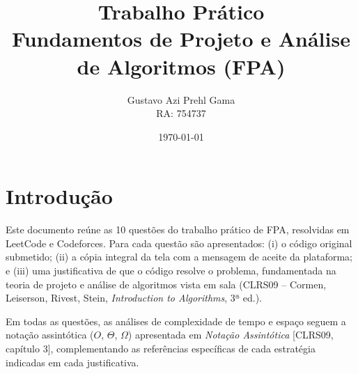 \documentclass[12pt,a4paper]{article}
\title{Trabalho Prático\\\large Fundamentos de Projeto e Análise de Algoritmos (FPA)}
\author{Gustavo Azi Prehl Gama \\ RA: 754737}
\date{\today}
\begin{document}
\maketitle

\section*{Introdução}

Este documento reúne as 10 questões do trabalho prático de FPA, resolvidas
em LeetCode e Codeforces. Para cada questão são apresentados: (i) o código
original submetido; (ii) a cópia integral da tela com a mensagem de aceite
da plataforma; e (iii) uma justificativa de que o código resolve o problema,
fundamentada na teoria de projeto e análise de algoritmos vista em sala
(CLRS09 -- Cormen, Leiserson, Rivest, Stein, \emph{Introduction to
Algorithms}, 3ª ed.).

Em todas as questões, as análises de complexidade de tempo e espaço seguem a
notação assintótica ($O$, $\Theta$, $\Omega$) apresentada em
\emph{Notação Assintótica} [CLRS09, capítulo 3], complementando as
referências específicas de cada estratégia indicadas em cada justificativa.

\tableofcontents
\newpage


\newpage

\newpage

\newpage

\newpage

\newpage

\newpage

\newpage

\newpage

\newpage

\end{document}
